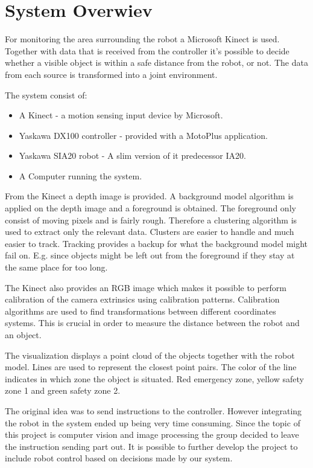 
\section{System Overwiev}

For monitoring the area surrounding the robot a Microsoft Kinect is used. Together with data that is received from the controller it's possible to decide whether a visible object is within a safe distance from the robot, or not. The data from each source is transformed into a joint environment.

The system consist of:
\begin{itemize}
\item A Kinect - a motion sensing input device by Microsoft.
\item Yaskawa DX100 controller - provided with a MotoPlus application.
\item Yaskawa SIA20 robot - A slim version of it predecessor IA20.
\item A Computer running the system.
\end{itemize}




From the Kinect a depth image is provided. A background model algorithm is applied on the depth image and a foreground is obtained. The foreground only consist of moving pixels and is fairly rough. Therefore a clustering algorithm is used to extract only the relevant data. Clusters are easier to handle and much easier to track. Tracking provides a backup for what the background model might fail on. E.g. since objects might be left out from the foreground if they stay at the same place for too long.

The Kinect also provides an RGB image which makes it possible to perform calibration of the camera extrinsics using calibration patterns. Calibration algorithms are used to find transformations between different coordinates systems. This is crucial in order to measure the distance between the robot and an object.

The visualization displays a point cloud of the objects together with the robot model. Lines are used to represent the closest point pairs. The color of the line indicates in which zone the object is situated. Red emergency zone, yellow safety zone 1 and green safety zone 2.

The original idea was to send instructions to the controller. However integrating the robot in the system ended up being very time consuming. Since the topic of this project is computer vision and image processing the group decided to leave the instruction sending part out. It is possible to further develop the project to include robot control based on decisions made by our system.   


